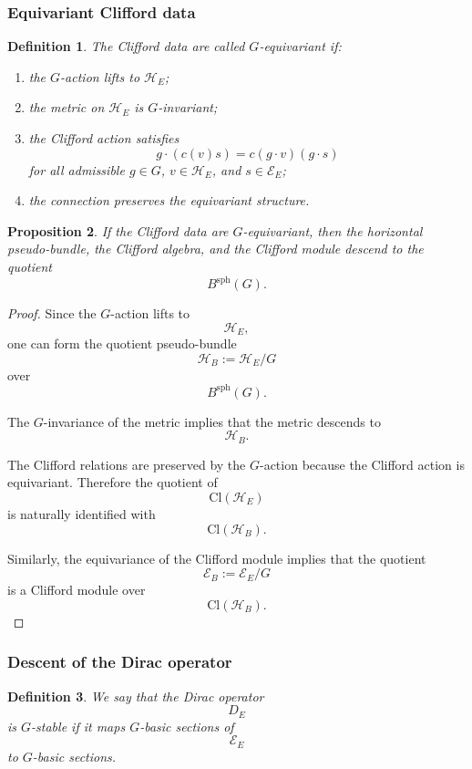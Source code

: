 \documentclass[11pt]{amsart}
\newtheorem{definition}{Definition}[section]
\newtheorem{proposition}[definition]{Proposition}
\begin{document}
\subsubsection{Equivariant Clifford data}

\begin{definition}
The Clifford data are called \(G\)-equivariant if:
\begin{enumerate}
\item the \(G\)-action lifts to \(\mathcal H_E\);
\item the metric on \(\mathcal H_E\) is \(G\)-invariant;
\item the Clifford action satisfies
\[
g\cdot(c(v)s)
=
c(g\cdot v)(g\cdot s)
\]
for all admissible \(g\in G\), \(v\in\mathcal H_E\), and
\(s\in\mathcal E_E\);
\item the connection preserves the equivariant structure.
\end{enumerate}
\end{definition}

\begin{proposition}
If the Clifford data are \(G\)-equivariant, then the horizontal pseudo-bundle,
the Clifford algebra, and the Clifford module descend to the quotient
\[
B^{\mathrm{sph}}(G).
\]
\end{proposition}

\begin{proof}
Since the \(G\)-action lifts to
\[
\mathcal H_E,
\]
one can form the quotient pseudo-bundle
\[
\mathcal H_B:=\mathcal H_E/G
\]
over
\[
B^{\mathrm{sph}}(G).
\]

The \(G\)-invariance of the metric implies that the metric descends to
\[
\mathcal H_B.
\]

The Clifford relations are preserved by the \(G\)-action because the Clifford
action is equivariant. Therefore the quotient of
\[
\mathrm{Cl}(\mathcal H_E)
\]
is naturally identified with
\[
\mathrm{Cl}(\mathcal H_B).
\]

Similarly, the equivariance of the Clifford module implies that the quotient
\[
\mathcal E_B:=\mathcal E_E/G
\]
is a Clifford module over
\[
\mathrm{Cl}(\mathcal H_B).
\]
\end{proof}

\subsubsection{Descent of the Dirac operator}

\begin{definition}
We say that the Dirac operator
\[
D_E
\]
is \(G\)-stable if it maps \(G\)-basic sections of
\[
\mathcal E_E
\]
to \(G\)-basic sections.
\end{definition}
\end{document}
